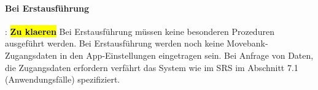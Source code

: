 \documentclass[12pt]{article} %
\begin{document}
\paragraph{Bei Erstausführung}: \hl{\textbf{Zu klaeren}}  Bei Erstausführung müssen keine besonderen
Prozeduren ausgeführt werden. Bei Erstausführung werden noch keine Movebank-Zugangsdaten in den App-Einstellungen eingetragen sein. Bei Anfrage von Daten,
die Zugangsdaten erfordern verfährt das System wie im SRS im Abschnitt 7.1 (Anwendungsfälle) spezifiziert.







\end{document}
